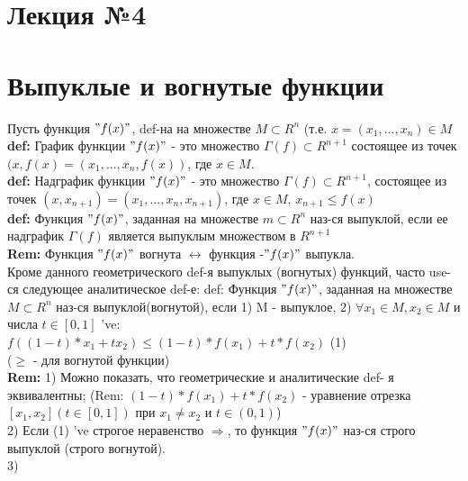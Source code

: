 \documentclass[a4paper]{article}
\begin{document}
\Large
\section*{Лекция №4}
\section*{Выпуклые и вогнутые функции}

Пусть функция $"f(x)"$, def-на на множестве $M \subset R^n$ (т.е. $x = (x_1, ... , x_n) \in M$ \\

\textbf{def:} График функции $"f(x)"$  - это множество $\Gamma(f) \subset R^{n+1}$ состоящее из точек $(x, f(x) = (x_1, ... , x_n, f(x))$, где $x \in M$. \\

\textbf{def:} Надграфик функции $"f(x)"$  - это множество $\Gamma(f) \subset R^{n+1}$, состоящее из точек $(x, x_{n+1}) = (x_1, ..., x_n, x_{n+1})$, где $x \in M$, $x_{n+1} \leqslant f(x)$ \\

\textbf{def:} Функция $"f(x)"$, заданная на множестве $m \subset R^n$ наз-ся выпуклой, если ее надграфик $\Gamma(f)$ является выпуклым множеством в $R^{n+1}$ \\

\textbf{Rem:} Функция $"f(x)"$ вогнута $\leftrightarrow$ функция -$"f(x)"$ выпукла. \\

Кроме данного геометрического def-я выпуклых (вогнутых) функций, часто use-ся следующее аналитическое def-е:
def: Функция $"f(x)"$, заданная на множестве $M \subset R^n$ наз-ся выпуклой(вогнутой), если 1) M - выпуклое, 2) $\forall x_1 \in M, x_2 \in M$ и числа $t \in [0,1]$ 've:\\
$f((1-t)*x_1+tx_2) \leqslant (1-t)*f(x_1) + t * f(x_2)$ (1) \\
($\geqslant$ - для вогнутой функции) \\

\textbf{Rem:} 1) Можно показать, что геометрические и аналитические def- я эквивалентны; (Rem: $(1-t)*f(x_1) + t * f(x_2)$ - уравнение отрезка $[x_1, x_2] (t \in [0, 1])$ при $x_1 \neq x_2$ и $t \in (0,1)$)\\
2) Если (1) 've строгое неравенство $\Rightarrow$, то функция $"f(x)"$ наз-ся строго выпуклой (строго вогнутой). \\
3) 
\end{document}
